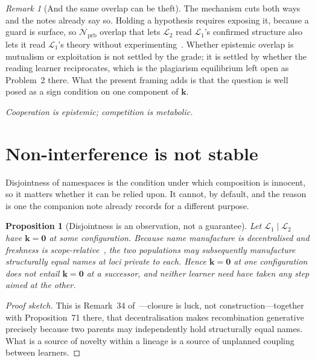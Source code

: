 \documentclass[11pt,a4paper]{article}
\theoremstyle{plain}
\newtheorem{proposition}[theorem]{Proposition}
\theoremstyle{definition}
\theoremstyle{remark}
\newtheorem{remark}[theorem]{Remark}
\newcommand{\Lrn}{\mathcal{L}}
\newcommand{\Nsp}{\mathcal{N}}
\newcommand{\Prb}{\Nsp_{\mathrm{prb}}}
\begin{document}
\begin{remark}[And the same overlap can be theft]
The mechanism cuts both ways and the notes already say so. Holding a hypothesis requires
exposing it, because a guard is surface, so $\Prb$ overlap that lets $\Lrn_2$ read $\Lrn_1$'s
confirmed structure also lets it read $\Lrn_1$'s theory without experimenting~\cite[\S10]{scientist}.
Whether epistemic overlap is mutualism or exploitation is not settled by the grade; it is settled
by whether the reading learner reciprocates, which is the plagiarism equilibrium left open
as Problem~2 there. What the present framing adds is that the question is well posed as a sign
condition on one component of $\mathbf{k}$.
\end{remark}

\begin{center}
\emph{Cooperation is epistemic; competition is metabolic.}
\end{center}

\section{Non-interference is not stable}\label{sec:stability}

Disjointness of namespaces is the condition under which composition is innocent, so it matters
whether it can be relied upon. It cannot, by default, and the reason is one the companion note
already records for a different purpose.

\begin{proposition}[Disjointness is an observation, not a guarantee]\label{prop:unstable}
Let $\Lrn_1 \mid \Lrn_2$ have $\mathbf{k} = \mathbf{0}$ at some configuration. Because name
manufacture is decentralised and freshness is scope-relative~\cite[Rem.~1]{scientist}, the two
populations may subsequently manufacture structurally equal names at loci private to each. Hence
$\mathbf{k} = \mathbf{0}$ at one configuration does not entail $\mathbf{k} = \mathbf{0}$ at a
successor, and neither learner need have taken any step aimed at the other.
\end{proposition}

\begin{proof}[Proof sketch]
This is Remark~34 of~\cite{scientist}---closure is luck, not construction---together with
Proposition~71 there, that decentralisation makes recombination generative precisely because two
parents may independently hold structurally equal names. What is a source of novelty within a
lineage is a source of unplanned coupling between learners.
\end{proof}
\end{document}
